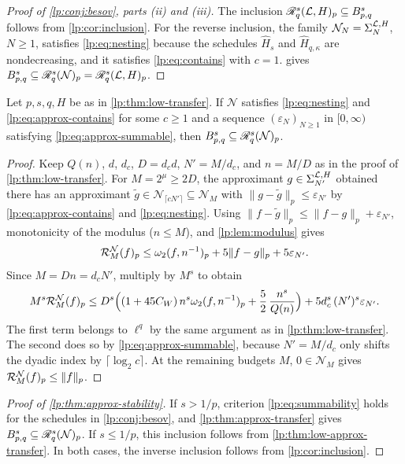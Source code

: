 \documentclass[11pt,a4paper]{article}
\begin{document}
\begin{proof}[Proof of \cref{lp:conj:besov}, parts (ii) and (iii)]
The inclusion $\mathscr R^{s}_{q}(\mathcal L,H)_p\subseteq B^{s}_{p,q}$ follows from \cref{lp:cor:inclusion}. For the reverse inclusion, the family $\mathcal N_N=\Sigma_{N}^{\mathcal L,H}$, $N\ge1$, satisfies \eqref{lp:eq:nesting} because the schedules $\widehat H_s$ and $\widehat H_{q,\kappa}$ are nondecreasing, and it satisfies \eqref{lp:eq:contains} with $c=1$.  gives $B^{s}_{p,q}\subseteq\mathscr R^{s}_{q}(\mathcal N)_p=\mathscr R^{s}_{q}(\mathcal L,H)_p$.
\end{proof}

\begin{proposicao}
\label{lp:thm:low-approx-transfer}
Let $p,s,q,H$ be as in \cref{lp:thm:low-transfer}. If $\mathcal N$ satisfies \eqref{lp:eq:nesting} and \eqref{lp:eq:approx-contains} for some $c\ge1$ and a sequence $(\varepsilon_N)_{N\ge1}$ in $[0,\infty)$ satisfying \eqref{lp:eq:approx-summable}, then $B^{s}_{p,q}\subseteq\mathscr R^{s}_{q}(\mathcal N)_p$.
\end{proposicao}

\begin{proof}
Keep $Q(n)$, $d$, $d_c$, $D=d_cd$, $N'=M/d_c$, and $n=M/D$ as in the proof of \cref{lp:thm:low-transfer}. For $M=2^\mu\ge2D$, the approximant $g\in\Sigma_{N'}^{\mathcal L,H}$ obtained there has an approximant $\tilde g\in\mathcal N_{\lceil cN'\rceil}\subseteq\mathcal N_M$ with $\|g-\tilde g\|_p\le\varepsilon_{N'}$ by \eqref{lp:eq:approx-contains} and \eqref{lp:eq:nesting}. Using $\|f-\tilde g\|_p\le\|f-g\|_p+\varepsilon_{N'}$, monotonicity of the modulus ($n\le M$), and \cref{lp:lem:modulus} gives
\[
 \mathcal R^{\mathcal N}_{M}(f)_p
 \le\omega_2(f,n^{-1})_{p}+5\|f-g\|_p+5\varepsilon_{N'}.
\]
Since $M=Dn=d_cN'$, multiply by $M^s$ to obtain
\[
 M^s\mathcal R^{\mathcal N}_{M}(f)_p
 \le D^s\Bigl((1+45C_W)\,n^s\omega_2(f,n^{-1})_{p}+\frac52\,\frac{n^s}{Q(n)}\Bigr)+5d_c^s\,(N')^s\varepsilon_{N'}.
\]
The first term belongs to $\ell^q$ by the same argument as in \cref{lp:thm:low-transfer}. The second does so by \eqref{lp:eq:approx-summable}, because $N'=M/d_c$ only shifts the dyadic index by $\lceil\log_2c\rceil$. At the remaining budgets $M$, $0\in\mathcal N_M$ gives $\mathcal R^{\mathcal N}_{M}(f)_p\le\|f\|_p$.
\end{proof}

\begin{proof}[Proof of \cref{lp:thm:approx-stability}]
If $s>1/p$, criterion \eqref{lp:eq:summability} holds for the schedules in \cref{lp:conj:besov}, and \cref{lp:thm:approx-transfer} gives $B^{s}_{p,q}\subseteq\mathscr R^{s}_{q}(\mathcal N)_p$. If $s\le1/p$, this inclusion follows from \cref{lp:thm:low-approx-transfer}. In both cases, the inverse inclusion follows from \cref{lp:cor:inclusion}.
\end{proof}
\end{document}
